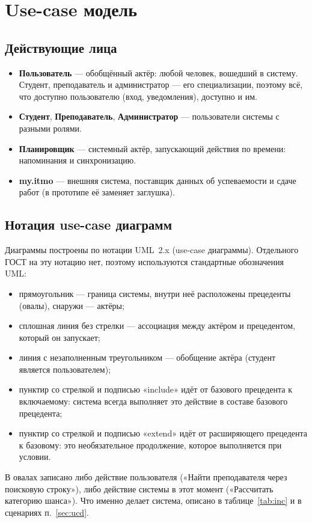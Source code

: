 \documentclass[a4paper,12pt]{article}
\begin{document}
\section{Use-case модель}

\subsection{Действующие лица}
\begin{itemize}
  \item \textbf{Пользователь} — обобщённый актёр: любой человек, вошедший в систему. Студент, преподаватель и администратор — его специализации, поэтому всё, что доступно пользователю (вход, уведомления), доступно и им.
  \item \textbf{Студент}, \textbf{Преподаватель}, \textbf{Администратор} — пользователи системы с разными ролями.
  \item \textbf{Планировщик} — системный актёр, запускающий действия по времени: напоминания и синхронизацию.
  \item \textbf{my.itmo} — внешняя система, поставщик данных об успеваемости и сдаче работ (в прототипе её заменяет заглушка).
\end{itemize}

\subsection{Нотация use-case диаграмм}
Диаграммы построены по нотации UML~2.x (use-case диаграммы). Отдельного ГОСТ на эту нотацию нет, поэтому используются стандартные обозначения UML:
\begin{itemize}
  \item прямоугольник — граница системы, внутри неё расположены прецеденты (овалы), снаружи — актёры;
  \item сплошная линия без стрелки — ассоциация между актёром и прецедентом, который он запускает;
  \item линия с незаполненным треугольником — обобщение актёра (студент является пользователем);
  \item пунктир со стрелкой и подписью «include» идёт от базового прецедента к включаемому: система всегда выполняет это действие в составе базового прецедента;
  \item пунктир со стрелкой и подписью «extend» идёт от расширяющего прецедента к базовому: это необязательное продолжение, которое выполняется при условии.
\end{itemize}
В овалах записано либо действие пользователя («Найти преподавателя через поисковую строку»), либо действие системы в этот момент («Рассчитать категорию шанса»). Что именно делает система, описано в таблице~\ref{tab:inc} и в сценариях п.~\ref{sec:ucd}.
\end{document}
